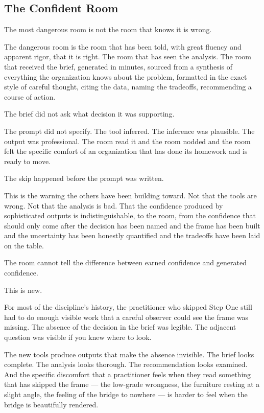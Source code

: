 \subsection*{The Confident Room}

The most dangerous room is not the room that knows it is wrong.

The dangerous room is the room that has been told, with great fluency and apparent rigor, that it is right. The room that has seen the analysis. The room that received the brief, generated in minutes, sourced from a synthesis of everything the organization knows about the problem, formatted in the exact style of careful thought, citing the data, naming the tradeoffs, recommending a course of action.

The brief did not ask what decision it was supporting.

The prompt did not specify. The tool inferred. The inference was plausible. The output was professional. The room read it and the room nodded and the room felt the specific comfort of an organization that has done its homework and is ready to move.

The skip happened before the prompt was written.

This is the warning the others have been building toward. Not that the tools are wrong. Not that the analysis is bad. That the confidence produced by sophisticated outputs is indistinguishable, to the room, from the confidence that should only come after the decision has been named and the frame has been built and the uncertainty has been honestly quantified and the tradeoffs have been laid on the table.

The room cannot tell the difference between earned confidence and generated confidence.

This is new.

For most of the discipline's history, the practitioner who skipped Step One still had to do enough visible work that a careful observer could see the frame was missing. The absence of the decision in the brief was legible. The adjacent question was visible if you knew where to look.

The new tools produce outputs that make the absence invisible. The brief looks complete. The analysis looks thorough. The recommendation looks examined. And the specific discomfort that a practitioner feels when they read something that has skipped the frame --- the low-grade wrongness, the furniture resting at a slight angle, the feeling of the bridge to nowhere --- is harder to feel when the bridge is beautifully rendered.

